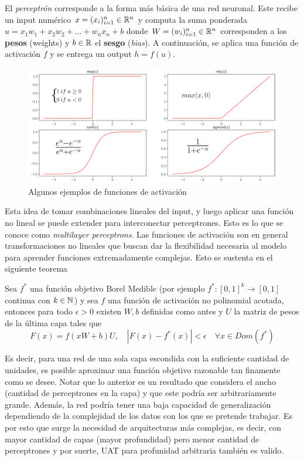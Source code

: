 El \textit{perceptrón} corresponde a la forma más básica de una red neuronal. Este recibe un input numérico $x = (x_i)_{i=1}^n \in \mathbb{R}^n$ y computa la suma ponderada $u = x_1w_1 + x_2w_2 + \dots + w_n x_n + b$ donde $W = (w_i)_{i=1}^n \in \mathbb{R}^n$ corresponden a los \textbf{pesos} (weights) y $b \in \mathbb{R}$ el \textbf{sesgo} (\textit{bias}). 
A continuación, se aplica una función de activación $f$ y se entrega un output $h = f(u)$.  
\begin{figure}[H]
  \centering
  \includegraphics[scale=.3]{img/cap5_activaciones}
  \caption{Algunos ejemplos de funciones de activación}
\end{figure}

Esta idea de tomar combinaciones lineales del input, y luego aplicar una función no lineal se puede extender para interconectar perceptrones. Esto es lo que se conoce como \textit{multilayer perceptrons}. Las funciones de activación son en general transformaciones no lineales que buscan dar la flexibilidad necesaria al modelo para aprender funciones extremadamente complejas. Esto se sustenta en el siguiente teorema 


\begin{theorem}

	Sea $f^{*}$ una función objetivo Borel Medible (por ejemplo $f^{*}:[0,1]^k \rightarrow [0,1]$ continua con $k \in {\mathbb N}$) y sea $f$ una función de activación no polinomial acotada, entonces para todo $\epsilon > 0$ existen $W,b$ definidas como antes y $U$ la matriz de pesos de la última capa tales que 
	\[
	F(x) = f(xW+b)U, \quad 
	|F(x)-f^{*}(x)|<\epsilon \quad \forall x \in Dom(f^{*}) 
	\]
\end{theorem} 

Es decir, para una red de una sola capa escondida con la suficiente cantidad de unidades, es posible aproximar una función objetivo razonable tan finamente como se desee. Notar que lo anterior es un resultado que considera el ancho (cantidad de perceptrones en la capa) y que este podría ser arbitrariamente grande. Además, la red podría tener una baja capacidad de generalización dependiendo de la complejidad de los datos con los que se pretende trabajar. Es por esto que surge la necesidad de arquitecturas más complejas, es decir, con mayor cantidad de capas (mayor profundidad) pero menor cantidad de perceptrones y por suerte, UAT para profunidad arbitraria también es valido. 



